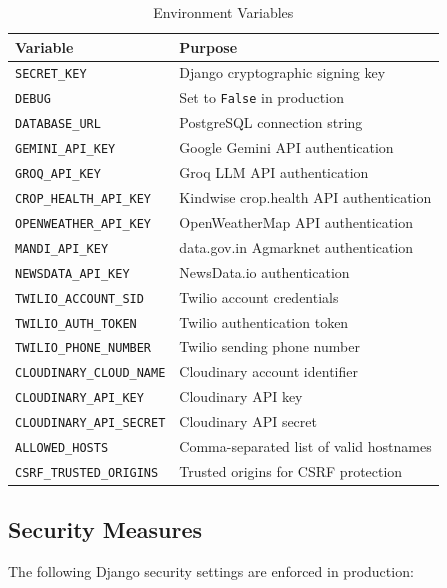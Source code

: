 \documentclass[12pt,a4paper]{article}
\begin{document}
\begin{table}[h]
\caption{Environment Variables}
\centering
\begin{tabular}{|l|p{8.5cm}|}
\hline
\textbf{Variable} & \textbf{Purpose} \\ \hline
\texttt{SECRET\_KEY} & Django cryptographic signing key \\ \hline
\texttt{DEBUG} & Set to \texttt{False} in production \\ \hline
\texttt{DATABASE\_URL} & PostgreSQL connection string \\ \hline
\texttt{GEMINI\_API\_KEY} & Google Gemini API authentication \\ \hline
\texttt{GROQ\_API\_KEY} & Groq LLM API authentication \\ \hline
\texttt{CROP\_HEALTH\_API\_KEY} & Kindwise crop.health API authentication \\ \hline
\texttt{OPENWEATHER\_API\_KEY} & OpenWeatherMap API authentication \\ \hline
\texttt{MANDI\_API\_KEY} & data.gov.in Agmarknet authentication \\ \hline
\texttt{NEWSDATA\_API\_KEY} & NewsData.io authentication \\ \hline
\texttt{TWILIO\_ACCOUNT\_SID} & Twilio account credentials \\ \hline
\texttt{TWILIO\_AUTH\_TOKEN} & Twilio authentication token \\ \hline
\texttt{TWILIO\_PHONE\_NUMBER} & Twilio sending phone number \\ \hline
\texttt{CLOUDINARY\_CLOUD\_NAME} & Cloudinary account identifier \\ \hline
\texttt{CLOUDINARY\_API\_KEY} & Cloudinary API key \\ \hline
\texttt{CLOUDINARY\_API\_SECRET} & Cloudinary API secret \\ \hline
\texttt{ALLOWED\_HOSTS} & Comma-separated list of valid hostnames \\ \hline
\texttt{CSRF\_TRUSTED\_ORIGINS} & Trusted origins for CSRF protection \\ \hline
\end{tabular}
\end{table}

\subsection*{Security Measures}

The following Django security settings are enforced in production:
\end{document}
